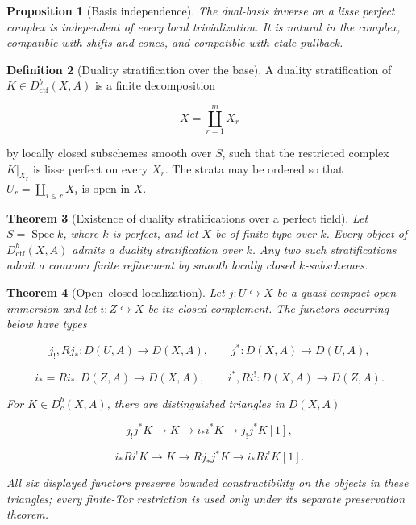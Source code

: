 \documentclass[10pt]{article}
\newtheorem{theorem}{Theorem}[section]
\newtheorem{proposition}[theorem]{Proposition}
\theoremstyle{definition}
\newtheorem{definition}[theorem]{Definition}
\newcommand{\Dbc}{D^b_c}
\newcommand{\Dctf}{D^b_{\mathrm{ctf}}}
\begin{document}
\begin{proposition}[Basis independence]
The dual-basis inverse on a lisse perfect complex is independent of every
local trivialization.  It is natural in the complex, compatible with shifts
and cones, and compatible with etale pullback.
\end{proposition}

\begin{definition}[Duality stratification over the base]
A duality stratification of \(K\in\Dctf(X,A)\) is a finite decomposition

\[
 X=\coprod_{r=1}^mX_r
\]

by locally closed subschemes smooth over \(S\), such that the restricted
complex \(K|_{X_r}\) is lisse perfect on every \(X_r\).  The strata may be
ordered so that
\(U_r=\coprod_{i\leq r}X_i\) is open in \(X\).
\end{definition}

\begin{theorem}[Existence of duality stratifications over a perfect field]
Let \(S=\operatorname{Spec}k\), where \(k\) is perfect, and let \(X\) be of
finite type over \(k\).  Every object of \(\Dctf(X,A)\) admits a duality
stratification over \(k\).  Any two such stratifications admit a common
finite refinement by smooth locally closed \(k\)-subschemes.
\end{theorem}

\begin{theorem}[Open--closed localization]
Let \(j:U\hookrightarrow X\) be a quasi-compact open immersion and let
\(i:Z\hookrightarrow X\) be its closed complement.  The functors occurring
below have types

\[
 j_!,Rj_*:D(U,A)\longrightarrow D(X,A),\qquad
 j^*:D(X,A)\longrightarrow D(U,A),
\]

\[
 i_*=Ri_*:D(Z,A)\longrightarrow D(X,A),\qquad
 i^*,Ri^!:D(X,A)\longrightarrow D(Z,A).
\]

For \(K\in\Dbc(X,A)\), there are distinguished triangles in \(D(X,A)\)

\[
 j_!j^*K\longrightarrow K\longrightarrow i_*i^*K
 \longrightarrow j_!j^*K[1],
\]

\[
 i_*Ri^!K\longrightarrow K\longrightarrow Rj_*j^*K
 \longrightarrow i_*Ri^!K[1].
\]

All six displayed functors preserve bounded constructibility on the objects
in these triangles; every finite-Tor restriction is used only under its
separate preservation theorem.
\end{theorem}
\end{document}
